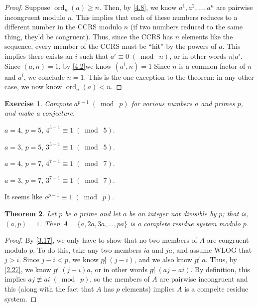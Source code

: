 \documentclass{article}
\DeclareMathOperator{\ord}{ord}
\newtheorem{thm}{Theorem}[section]
\newtheorem{ex}[thm]{Exercise}
\numberwithin{equation}{thm}
\providecommand{\gmod}[1]{\; (\bmod \; #1)}
\begin{document}
\begin{proof}
  Suppose $\ord_n (a) \geq n$. Then, by \ref{4.8}, we know $a^1, a^2, \ldots, a^n$ are pairwise incongruent modulo $n$. This implies that each of these numbers reduces to a different number in the CCRS modulo $n$ (if two numbers reduced to the same thing, they'd be congruent). Thus, since the CCRS has $n$ elements like the sequence, every member of the CCRS must be ``hit'' by the powers of $a$. This implies there exists an $i$ such that $a^i \equiv 0 \gmod n$, or in other words $n | a^i$.
  Since $(a, n) = 1$, by \ref{4.2}we know $(a^i, n) = 1$ Since $n$ is a common factor of $n$ and $a^i$, we conclude $n = 1$. This is the one exception to the theorem: in any other case, we now know $\ord_n (a) < n$.
\end{proof}



\begin{ex} \label{4.12}
  Compute $a^{p-1} \gmod p$ for various numbers $a$ and primes $p$, and make a conjecture.
\end{ex}

$a = 4$, $p = 5$, $4^{5-1} \equiv 1 \gmod 5$.

$a = 3$, $p = 5$, $3^{5-1} \equiv 1 \gmod 5$.

$a = 4$, $p = 7$, $4^{7-1} \equiv 1 \gmod 7$.

$a = 3$, $p = 7$, $3^{7-1} \equiv 1 \gmod 7$.

It seems like $a^{p-1} \equiv 1 \gmod p$.



\begin{thm} \label{4.13}
  Let $p$ be a prime and let $a$ be an integer not divisible by $p$; that is, $(a, p) = 1$. Then $A = \{a, 2a, 3a, \ldots, pa\}$ is a complete residue system modulo $p$.
\end{thm}

\begin{proof}
  By \ref{3.17}, we only have to show that no two members of $A$ are congruent modulo $p$. To do this, take any two members $ia$ and $ja$, and assume WLOG that $j > i$. Since $j - i < p$, we know $p \not | \; (j-i)$, and we also know $p \not | \; a$. Thus, by \ref{2.27}, we know $p \not | \; (j-i)a$, or in other words $p \not | \; (aj - ai)$.
  By definition, this implies $aj \not \equiv ai \gmod p$, so the members of $A$ are pairwise incongruent and this (along with the fact that $A$ has $p$ elements) implies $A$ is a compelte residue system.
\end{proof}
\end{document}
